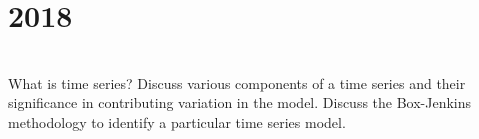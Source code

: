 \section*{2018}
\vspace{-.5cm}
\hrulefill \smallskip\\
 What is time series? Discuss various components of a time series and their significance in contributing variation in the model.
\myline
{} Discuss the Box-Jenkins methodology to identify a particular time series model.
